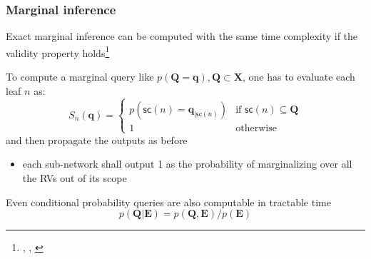 \documentclass[10pt, t, xcolor={usenames,dvipsnames,svgnames}, compress]{beamer}
\newcommand{\customcite}[1]{\footnote{\scriptsize \citeauthor{#1}, \citetitle{#1}, \citeyear{#1}}}
\begin{document}
\begin{frame}
\begin{center}
{    
}
\end{center}
\end{frame}


\begin{frame}
  \frametitle{Marginal inference}

Exact marginal inference can be computed with the same time complexity if the
validity property holds\customcite{Poon2011}

To compute a marginal query like $p(\mathbf{Q=q}),
\mathbf{Q}\subset\mathbf{X}$, one has to evaluate each leaf $n$ as:
\begin{equation}
  \label{eq:marg}
  S_{n}(\mathbf{q}) = \begin{cases}
    p(\mathsf{sc}(n) =\mathbf{q}_{|\mathsf{sc}(n)}) & \text{if $\mathsf{sc}(n)\subseteq\mathbf{Q}$} \\
    1 & \text{otherwise}
  \end{cases}
\end{equation}
and then propagate the outputs as before

\begin{itemize}
\item each sub-network shall output 1 as the probability of marginalizing
over all the RVs out of its scope
\end{itemize}

Even conditional probability queries are also computable
in tractable time
$$p(\mathbf{Q}|\mathbf{E}) = p(\mathbf{Q}, \mathbf{E})/p(\mathbf{E})$$

\end{frame}
\end{document}
